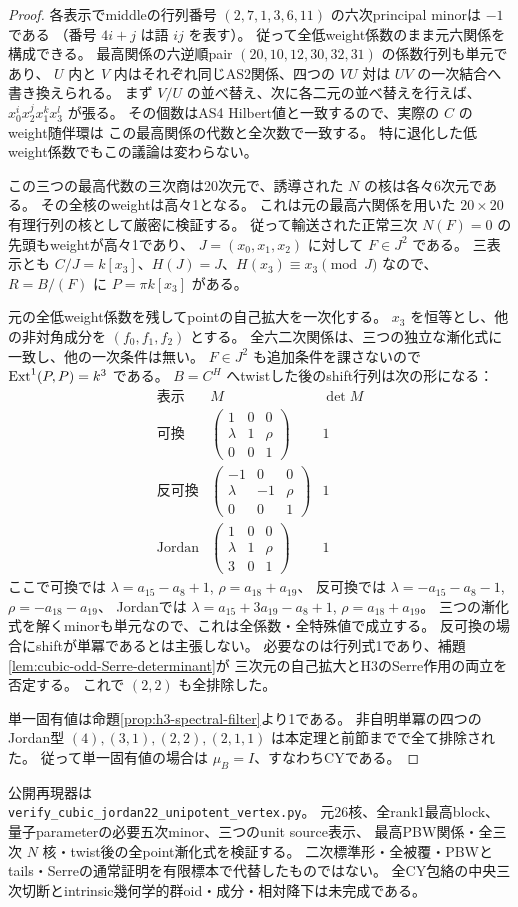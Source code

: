 \begin{proof}
各表示でmiddleの行列番号 $(2,7,1,3,6,11)$ の六次principal minorは $-1$ である
（番号 $4i+j$ は語 $ij$ を表す）。
従って全低weight係数のまま元六関係を構成できる。
最高関係の六逆順pair $(20,10,12,30,32,31)$ の係数行列も単元であり、
$U$ 内と $V$ 内はそれぞれ同じAS2関係、四つの $VU$ 対は $UV$ の一次結合へ書き換えられる。
まず $V/U$ の並べ替え、次に各二元の並べ替えを行えば、
$x_0^ix_2^jx_1^kx_3^l$ が張る。
その個数はAS4 Hilbert値と一致するので、実際の $C$ のweight随伴環は
この最高関係の代数と全次数で一致する。
特に退化した低weight係数でもこの議論は変わらない。

この三つの最高代数の三次商は20次元で、誘導された $N$ の核は各々6次元である。
その全核のweightは高々1となる。
これは元の最高六関係を用いた $20\times20$ 有理行列の核として厳密に検証する。
従って輸送された正常三次 $N(F)=0$ の先頭もweightが高々1であり、
$J=(x_0,x_1,x_2)$ に対して $F\in J^2$ である。
三表示とも $C/J=k[x_3]$、$H(J)=J$、$H(x_3)\equiv x_3\pmod J$ なので、
$R=B/(F)$ に $P=\pi k[x_3]$ がある。

元の全低weight係数を残してpointの自己拡大を一次化する。
$x_3$ を恒等とし、他の非対角成分を $(f_0,f_1,f_2)$ とする。
全六二次関係は、三つの独立な漸化式に一致し、他の一次条件は無い。
$F\in J^2$ も追加条件を課さないので $\operatorname{Ext}^1(P,P)=k^3$ である。
$B=C^H$ へtwistした後のshift行列は次の形になる：
\[
\begin{array}{c|c|c}
\text{表示}&M&\det M\\\hline
\text{可換}&\begin{pmatrix}1&0&0\\\lambda&1&\rho\\0&0&1\end{pmatrix}&1\\
\text{反可換}&\begin{pmatrix}-1&0&0\\\lambda&-1&\rho\\0&0&1\end{pmatrix}&1\\
\text{Jordan}&\begin{pmatrix}1&0&0\\\lambda&1&\rho\\3&0&1\end{pmatrix}&1
\end{array}
\]
ここで可換では $\lambda=a_{15}-a_8+1$, $\rho=a_{18}+a_{19}$、
反可換では $\lambda=-a_{15}-a_8-1$, $\rho=-a_{18}-a_{19}$、
Jordanでは $\lambda=a_{15}+3a_{19}-a_8+1$, $\rho=a_{18}+a_{19}$。
三つの漸化式を解くminorも単元なので、これは全係数・全特殊値で成立する。
反可換の場合にshiftが単冪であるとは主張しない。
必要なのは行列式1であり、補題\ref{lem:cubic-odd-Serre-determinant}が
三次元の自己拡大とH3のSerre作用の両立を否定する。
これで $(2,2)$ も全排除した。

単一固有値は命題\ref{prop:h3-spectral-filter}より1である。
非自明単冪の四つのJordan型 $(4),(3,1),(2,2),(2,1,1)$ は本定理と前節までで全て排除された。
従って単一固有値の場合は $\mu_B=I$、すなわちCYである。
\end{proof}
公開再現器は\\
\texttt{verify\_cubic\_jordan22\_unipotent\_vertex.py}。
元26核、全rank1最高block、量子parameterの必要五次minor、三つのunit source表示、
最高PBW関係・全三次 $N$ 核・twist後の全point漸化式を検証する。
二次標準形・全被覆・PBWとtails・Serreの通常証明を有限標本で代替したものではない。
全CY包絡の中央三次切断とintrinsic幾何学的群oid・成分・相対降下は未完成である。
